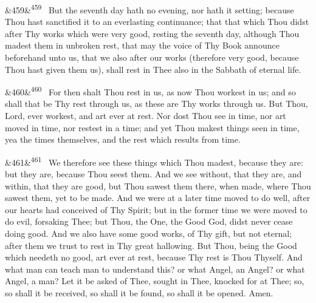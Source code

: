 \documentclass[12pt]{article}
\newcommand{\para}[1][]{\par\noindent\ifx&#1&\else\textsuperscript{\footnotesize #1}~\fi}
\begin{document}
\para[459] But the seventh day hath no evening, nor hath it setting; because Thou hast sanctified it to an everlasting continuance; that that which Thou didst after Thy works which were very good, resting the seventh day, although Thou madest them in unbroken rest, that may the voice of Thy Book announce beforehand unto us, that we also after our works (therefore very good, because Thou hast given them us), shall rest in Thee also in the Sabbath of eternal life.

\para[460] For then shalt Thou rest in us, as now Thou workest in us; and so shall that be Thy rest through us, as these are Thy works through us. But Thou, Lord, ever workest, and art ever at rest. Nor dost Thou see in time, nor art moved in time, nor restest in a time; and yet Thou makest things seen in time, yea the times themselves, and the rest which results from time.

\para[461] We therefore see these things which Thou madest, because they are: but they are, because Thou seest them. And we see without, that they are, and within, that they are good, but Thou sawest them there, when made, where Thou sawest them, yet to be made. And we were at a later time moved to do well, after our hearts had conceived of Thy Spirit; but in the former time we were moved to do evil, forsaking Thee; but Thou, the One, the Good God, didst never cease doing good. And we also have some good works, of Thy gift, but not eternal; after them we trust to rest in Thy great hallowing. But Thou, being the Good which needeth no good, art ever at rest, because Thy rest is Thou Thyself. And what man can teach man to understand this? or what Angel, an Angel? or what Angel, a man? Let it be asked of Thee, sought in Thee, knocked for at Thee; so, so shall it be received, so shall it be found, so shall it be opened. Amen.
\end{document}

